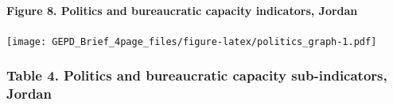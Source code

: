 \documentclass[twocolumn]{article}
\let\oldparagraph\paragraph
\renewcommand{\paragraph}[1]{\oldparagraph{#1}\mbox{}}
\begin{document}
\hypertarget{figure-8.-politics-and-bureaucratic-capacity-indicators-jordan}{%
\paragraph{Figure 8. Politics and bureaucratic capacity indicators,
Jordan}\label{figure-8.-politics-and-bureaucratic-capacity-indicators-jordan}}

\texttt{[image: GEPD\_Brief\_4page\_files/figure-latex/politics\_graph-1.pdf]}

\hypertarget{table-4.-politics-and-bureaucratic-capacity-sub-indicators-jordan}{%
\subsubsection{Table 4. Politics and bureaucratic capacity
sub-indicators,
Jordan}\label{table-4.-politics-and-bureaucratic-capacity-sub-indicators-jordan}}
\end{document}
